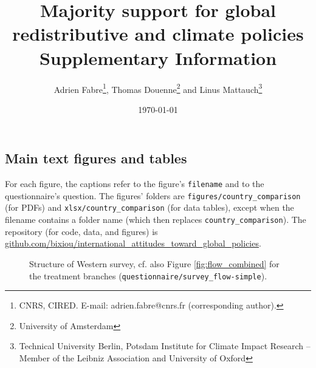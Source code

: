 \documentclass[12pt,english]{article}
\title{Majority support for global redistributive and climate policies
\\\textbf{Supplementary Information}}
\author{Adrien Fabre\footnote{CNRS, CIRED. E-mail: adrien.fabre@cnrs.fr (corresponding author).}, Thomas Douenne\footnote{University of Amsterdam}\; and Linus Mattauch\footnote{Technical University Berlin, Potsdam Institute for Climate Impact Research -- Member of the Leibniz Association and University of Oxford}
} %
\date{\today} %
\begin{document}

\sloppy
\tableofcontents

\onehalfspacing %

\begin{bibunit}
\section*{Main text figures and tables}\label{app:main_text_figures_tables}

For each figure, the captions refer to the figure's \verb|filename| and to the questionnaire's question. The figures' folders are \verb|figures/country_comparison| (for PDFs) and \verb|xlsx/country_comparison| (for data tables), except when the filename contains a folder name (which then replaces \verb|country_comparison|). The repository (for code, data, and figures) is \href{https://github.com/bixiou/international_attitudes_toward_global_policies}{github.com/bixiou/international\_attitudes\_toward\_global\_policies}.

\begin{figure}[h!]
    \cprotect\caption[Western surveys' structure]{Structure of Western survey, cf. also Figure \ref{fig:flow_combined} for the treatment branches (\verb|questionnaire/survey_flow-simple|).}\label{fig:flow_simple}
\end{figure}


\end{bibunit}
\end{document}
